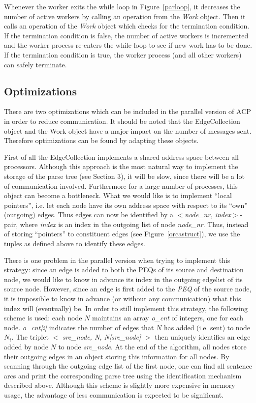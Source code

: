 Whenever the worker exits the while loop in Figure~\ref{parloop}, it
decreases the number of active workers by calling an operation from
the {\em Work} object. Then it calls an operation of the {\em Work}
object which checks for the termination condition. If the termination
condition is false, the number of active workers is incremented and
the worker process re-enters the while loop to see if new work has to be done.
If the termination condition is true, the worker process (and all other
workers) can safely terminate. 

\subsection{Optimizations}

There are two optimizations which can be included in the parallel
version of ACP in order to reduce communication. It
should be noted that the EdgeCollection object and the Work object
have a major impact on the number of messages sent. Therefore
optimizations can be found by adapting these objects.

First of all the EdgeCollection implements a shared address space
between all processors. Although this approach is the most natural
way to implement the storage of the parse tree (see Section 3), it
will be slow, since there will be a lot of communication involved.
Furthermore for a large number of processes, this object can become a
bottleneck. What we would like is to implement ``local pointers'',
i.e. let each node have its own address space with respect to its
``own'' (outgoing) edges. Thus edges can now be identified by a
$<${\em node\_nr, index}$>$-pair, where {\em index} is an index in the
outgoing list of node {\em node\_nr}. Thus, instead of storing
``pointers'' to constituent edges (see Figure~\ref{orcastruct}), we
use the tuples as defined above to identify these edges.

There is one problem in the parallel version when
trying to implement this strategy: since an edge is added to both the
PEQs of its source and destination node, we would like to know in
advance its index in the outgoing edgelist of its source node.
However, since an edge is first added to the {\em PEQ} of the source
node, it is impossible to know in advance (or without any communication)
what this index will (eventually) be. In order to still implement this
strategy, the following scheme is used: each node $N$ maintains an
array {\em o\_cnt} of integers, one for each node. {\em o\_cnt[i]}
indicates the number of edges that $N$ has added (i.e. sent) to node
$N_i$.  The triplet $<$ {\em src\_node, N, N[src\_node]} $>$ then
uniquely identifies
an edge added by node $N$ to node {\em src\_node}. At the end of the
algorithm, all nodes store their outgoing edges in an object storing
this information for all nodes. By scanning through
the outgoing edge list of the first node, one can find all sentence arcs
and print the corresponding parse tree using the
identification mechanism described above. Although this scheme is
slightly more expensive in memory usage, the advantage of less
communication is expected to be significant. 

